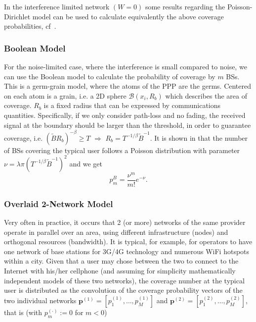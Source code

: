 \documentclass[conference,twocolum,final]{IEEEtran}
\begin{document}
In the interference limited network $(W=0)$ some results regarding the Poisson-Dirichlet model can be used to calculate equivalently the above coverage probabilities, cf~\cite[Prop,~6]{sinrPD}. 













\subsubsection{Boolean Model} For the noise-limited case, where the interference is small compared to noise, we can use the Boolean model to calculate the probability of coverage by $m$ BSs. This is a germ-grain model, where the atoms of the PPP are the germs. Centered on each atom is a grain, i.e. a 2D sphere $\mathcal{B}\left(x_i,R_b\right)$ which describes the area of coverage. $R_b$ is a fixed radius that can be expressed by communications quantities. Specifically, if we only consider path-loss and no fading, the received signal at the boundary should be larger than the threshold, in order to guarantee coverage, i.e. $(\tilde{B}R_b)^{-\beta}\geq T$ $\Rightarrow$ $R_b=T^{-1/\beta}\tilde{B}^{-1}$.
It is shown in \cite[Lemma 3.1]{BacBlaVol1} that the number of BSs covering the typical user follows a Poisson distribution with parameter $\nu=\lambda\pi\left(T^{-1/\beta}\tilde{B}^{-1}\right)^2$ and we get
\begin{equation}
\label{pBoo}
p_m^B  =  \frac{\nu^m}{m!}e^{-\nu}.
\end{equation}



\subsubsection{Overlaid 2-Network Model} Very often in practice, it occurs that 2 (or more) networks of the same provider operate in parallel over an area, using different infrastructure (nodes) and orthogonal resources (bandwidth). It is typical, for example, for operators to have one network of base stations for 3G/4G technology and numerous WiFi hotspots within a city. Given that a user may chose between the two to connect to the Internet with his/her cellphone (and assuming for simplicity mathematically independent models of these two networks), the coverage number at the typical user is distributed as the convolution of the coverage probability vectors of the two individual networks $\mathbf{p}^{(1)}=\left[p_1^{(1)},\ldots,p_M^{(1)}\right]$ and $\mathbf{p}^{(2)}=\left[p_1^{(2)},\ldots,p_M^{(2)}\right]$, that is (with $p_m^{(\cdot)}:=0$ for $m<0$)
\end{document}

